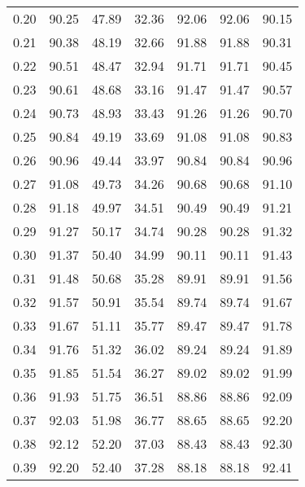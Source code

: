 \begin{tabular}{|c|c|c|c|c|c|c|}
      0.20 &     90.25 &     47.89 &      32.36 &   92.06 &      92.06 &         90.15 \\
      0.21 &     90.38 &     48.19 &      32.66 &   91.88 &      91.88 &         90.31 \\
      0.22 &     90.51 &     48.47 &      32.94 &   91.71 &      91.71 &         90.45 \\
      0.23 &     90.61 &     48.68 &      33.16 &   91.47 &      91.47 &         90.57 \\
      0.24 &     90.73 &     48.93 &      33.43 &   91.26 &      91.26 &         90.70 \\
      0.25 &     90.84 &     49.19 &      33.69 &   91.08 &      91.08 &         90.83 \\
      0.26 &     90.96 &     49.44 &      33.97 &   90.84 &      90.84 &         90.96 \\
      0.27 &     91.08 &     49.73 &      34.26 &   90.68 &      90.68 &         91.10 \\
      0.28 &     91.18 &     49.97 &      34.51 &   90.49 &      90.49 &         91.21 \\
      0.29 &     91.27 &     50.17 &      34.74 &   90.28 &      90.28 &         91.32 \\
      0.30 &     91.37 &     50.40 &      34.99 &   90.11 &      90.11 &         91.43 \\
      0.31 &     91.48 &     50.68 &      35.28 &   89.91 &      89.91 &         91.56 \\
      0.32 &     91.57 &     50.91 &      35.54 &   89.74 &      89.74 &         91.67 \\
      0.33 &     91.67 &     51.11 &      35.77 &   89.47 &      89.47 &         91.78 \\
      0.34 &     91.76 &     51.32 &      36.02 &   89.24 &      89.24 &         91.89 \\
      0.35 &     91.85 &     51.54 &      36.27 &   89.02 &      89.02 &         91.99 \\
      0.36 &     91.93 &     51.75 &      36.51 &   88.86 &      88.86 &         92.09 \\
      0.37 &     92.03 &     51.98 &      36.77 &   88.65 &      88.65 &         92.20 \\
      0.38 &     92.12 &     52.20 &      37.03 &   88.43 &      88.43 &         92.30 \\
      0.39 &     92.20 &     52.40 &      37.28 &   88.18 &      88.18 &         92.41 \\

\end{tabular}
